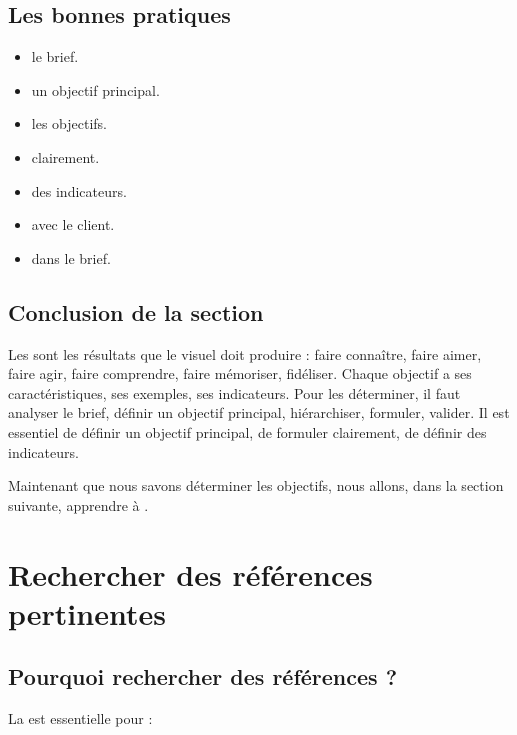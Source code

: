 \subsection{Les bonnes pratiques}

\begin{itemize}
    \item {} le brief.
    \item {} un objectif principal.
    \item {} les objectifs.
    \item {} clairement.
    \item {} des indicateurs.
    \item {} avec le client.
    \item {} dans le brief.
\end{itemize}

\subsection*{Conclusion de la section}

Les  sont les résultats que le visuel doit produire : faire connaître, faire aimer, faire agir, faire comprendre, faire mémoriser, fidéliser. Chaque objectif a ses caractéristiques, ses exemples, ses indicateurs. Pour les déterminer, il faut analyser le brief, définir un objectif principal, hiérarchiser, formuler, valider. Il est essentiel de définir un objectif principal, de formuler clairement, de définir des indicateurs.

Maintenant que nous savons déterminer les objectifs, nous allons, dans la section suivante, apprendre à .

\section{Rechercher des références pertinentes}

\subsection{Pourquoi rechercher des références ?}

La  est essentielle pour :

